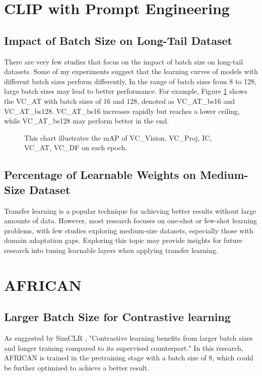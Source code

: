 \section{CLIP with Prompt Engineering}
\subsection{Impact of Batch Size on Long-Tail Dataset}
There are very few studies that focus on the impact of batch size on long-tail datasets. Some of my experiments suggest that the learning curves of models with different batch sizes perform differently. In the range of batch sizes from 8 to 128, large batch sizes may lead to better performance. For example, Figure \ref{fig:futurework_bs} shows the VC\_AT with batch sizes of 16 and 128, denoted as VC\_AT\_bs16 and VC\_AT\_bs128. VC\_AT\_bs16 increases rapidly but reaches a lower ceiling, while VC\_AT\_bs128 may perform better in the end.

\begin{figure}[ht]
    \centering
    \resizebox{1.0\textwidth}{!}{}
    \caption[mAP of VC\_AT\_bs16 and VC\_AT\_bs128 on each Epoch]{This chart illustrates the mAP of VC\_Vision, VC\_Proj, IC, VC\_AT, VC\_DF on each epoch.}
    \label{fig:futurework_bs}
\end{figure}

\subsection{Percentage of Learnable Weights on Medium-Size Dataset}
Transfer learning is a popular technique for achieving better results without large amounts of data. However, most research focuses on one-shot or few-shot learning problems, with few studies exploring medium-size datasets, especially those with domain adaptation gaps. Exploring this topic may provide insights for future research into tuning learnable layers when applying transfer learning.

\section{AFRICAN}
\subsection{Larger Batch Size for Contrastive learning}
As suggested by SimCLR \parencite{pmlr-v119-chen20j}, "Contrastive learning benefits from larger batch sizes and longer training compared to its supervised counterpart." In this research, AFRICAN is trained in the pretraining stage with a batch size of 8, which could be further optimized to achieve a better result.

